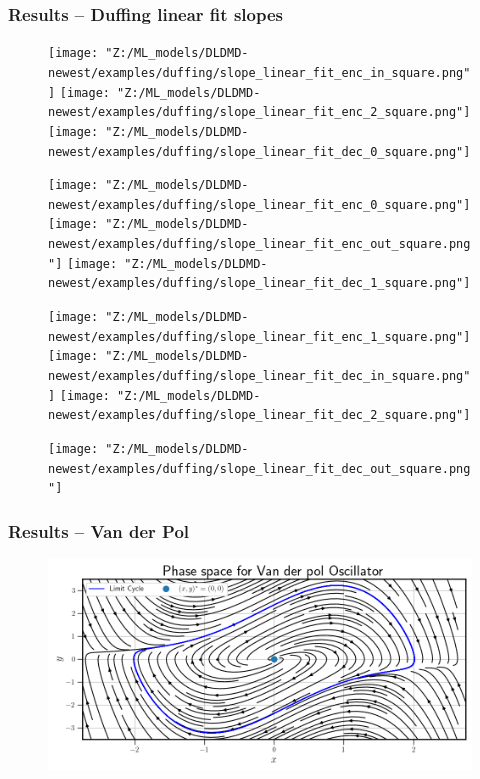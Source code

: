 \documentclass[11pt,aspectratio=169]{beamer}
\begin{document}
    \begin{frame}
        \frametitle{Results -- Duffing linear fit slopes}
        \begin{figure}
            \centering
            \begin{minipage}{.3333\textwidth}
                \texttt{[image: "Z:/ML\_models/DLDMD-newest/examples/duffing/slope\_linear\_fit\_enc\_in\_square.png"]}
                \texttt{[image: "Z:/ML\_models/DLDMD-newest/examples/duffing/slope\_linear\_fit\_enc\_2\_square.png"]}
                \texttt{[image: "Z:/ML\_models/DLDMD-newest/examples/duffing/slope\_linear\_fit\_dec\_0\_square.png"]}
            \end{minipage}%
            \begin{minipage}{.3333\textwidth}
                \texttt{[image: "Z:/ML\_models/DLDMD-newest/examples/duffing/slope\_linear\_fit\_enc\_0\_square.png"]}
                \texttt{[image: "Z:/ML\_models/DLDMD-newest/examples/duffing/slope\_linear\_fit\_enc\_out\_square.png"]}
                \texttt{[image: "Z:/ML\_models/DLDMD-newest/examples/duffing/slope\_linear\_fit\_dec\_1\_square.png"]}
            \end{minipage}%
            \begin{minipage}{.3333\textwidth}
                \texttt{[image: "Z:/ML\_models/DLDMD-newest/examples/duffing/slope\_linear\_fit\_enc\_1\_square.png"]}
                \texttt{[image: "Z:/ML\_models/DLDMD-newest/examples/duffing/slope\_linear\_fit\_dec\_in\_square.png"]}
                \texttt{[image: "Z:/ML\_models/DLDMD-newest/examples/duffing/slope\_linear\_fit\_dec\_2\_square.png"]}
            \end{minipage}
            \texttt{[image: "Z:/ML\_models/DLDMD-newest/examples/duffing/slope\_linear\_fit\_dec\_out\_square.png"]}
        \end{figure}
    \end{frame}



    \begin{frame}
        \frametitle{Results -- Van der Pol}
        \begin{figure}
            \centering
            \includegraphics[width=\textwidth]{../Figures/van_der_pol_phase_space.png}
        \end{figure}
    \end{frame}
\end{document}
